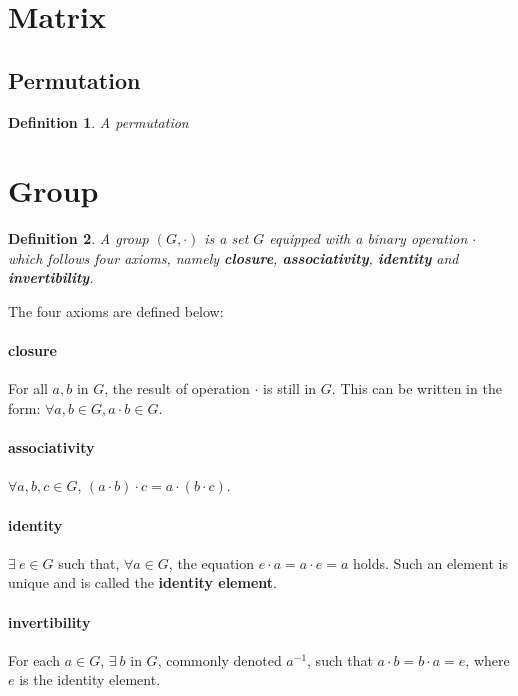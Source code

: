 \documentclass[UTF8]{ctexart}
\newtheorem{definition}{Definition}
\begin{document}
\section{Matrix}
\subsection{Permutation}
\begin{definition}
    A permutation
\end{definition}



\section{Group}
\begin{defbox}
    \begin{definition}
        A group $ (G, \cdot) $ is a set $ G $ equipped with a binary operation $ \cdot $ which follows four axioms, namely \textbf{closure}, \textbf{associativity}, \textbf{identity} and \textbf{invertibility}.
    \end{definition}    
\end{defbox}


The four axioms are defined below:
\paragraph{closure}
For all $ a, b $ in $ G $, the result of operation $ \cdot $ is still in $ G $. This can be written in the form: $ \forall a, b \in G, a \cdot b \in G $.

\paragraph{associativity}
$ \forall a, b, c \in G $, $ (a \cdot b) \cdot c = a \cdot (b \cdot c) $.

\paragraph{identity}
$ \exists\ e \in G $ such that, $ \forall a \in G $, the equation $ e \cdot a = a \cdot e = a $ holds. Such an element is unique and is called the \textbf{identity element}.

\paragraph{invertibility}
For each $ a \in G $, $ \exists\ b $ in $ G $, commonly denoted $ a^{-1} $, such that $ a \cdot b = b \cdot a = e $, where $ e $ is the identity element.
\end{document}
